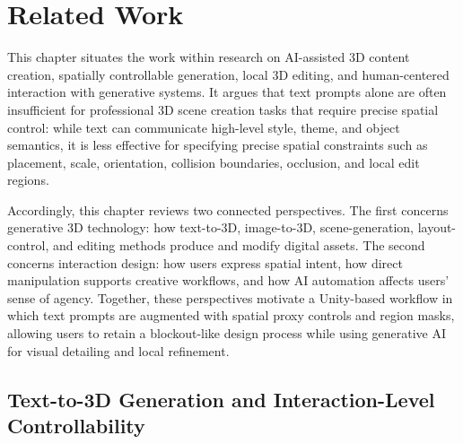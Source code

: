 \documentclass[11pt]{report}
\begin{document}
\lstset{language=Java, basicstyle=\footnotesize}

\renewcommand{\thepage}{\roman{page}}
\newcommand{\monthword}[1]{\ifcase#1\or January\or February\or March\or April\or
                                        May\or June\or July\or August\or
                                        September\or October\or November\or December\fi} 




\clearpage

\begingroup
  \pagestyle{plain}

\setcounter{tocdepth}{2}
  \tableofcontents
  \clearpage
\endgroup 

\pagestyle{fancy}
\setcounter{page}{1}
\renewcommand{\thepage}{\arabic{page}}

\chapter{Related Work}
\label{chap:related-work}

This chapter situates the work within research on AI-assisted 3D content creation, spatially controllable generation, local 3D editing, and human-centered interaction with generative systems. It argues that text prompts alone are often insufficient for professional 3D scene creation tasks that require precise spatial control: while text can communicate high-level style, theme, and object semantics, it is less effective for specifying precise spatial constraints such as placement, scale, orientation, collision boundaries, occlusion, and local edit regions.

Accordingly, this chapter reviews two connected perspectives. The first concerns generative 3D technology: how text-to-3D, image-to-3D, scene-generation, layout-control, and editing methods produce and modify digital assets. The second concerns interaction design: how users express spatial intent, how direct manipulation supports creative workflows, and how AI automation affects users' sense of agency. Together, these perspectives motivate a Unity-based workflow in which text prompts are augmented with spatial proxy controls and region masks, allowing users to retain a blockout-like design process while using generative AI for visual detailing and local refinement.

\section{Text-to-3D Generation and Interaction-Level Controllability}
\label{sec:rw-text-to-3d}
\end{document}
